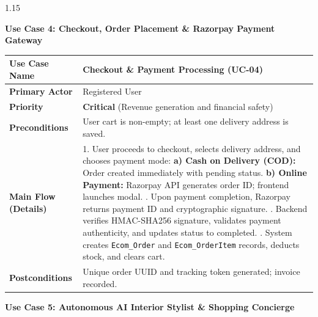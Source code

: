 \documentclass[12pt,a4paper]{article}
\begin{document}
{\fontsize{13}{18}\selectfont
\begin{spacing}{1.15}

\noindent
\textbf{Use Case 4: Checkout, Order Placement \& Razorpay Payment Gateway}

\vspace{0.04in}

\begin{center}
\renewcommand{\arraystretch}{1.2}
\fontsize{10.5}{14}\selectfont
\begin{tabular}{|p{1.6in}|p{4.9in}|}
\hline
\textbf{Use Case Name} & Checkout \& Payment Processing (\textbf{UC-04}) \\ \hline
\textbf{Primary Actor} & Registered User \\ \hline
\textbf{Priority} & \textbf{Critical} (Revenue generation and financial safety) \\ \hline
\textbf{Preconditions} & User cart is non-empty; at least one delivery address is saved. \\ \hline
\textbf{Main Flow (Details)} &
1. User proceeds to checkout, selects delivery address, and chooses payment mode: \newline
   \textbf{a) Cash on Delivery (COD):} Order created immediately with pending status. \newline
   \textbf{b) Online Payment:} Razorpay API generates order ID; frontend launches modal. \newline
2. Upon payment completion, Razorpay returns payment ID and cryptographic signature. \newline
3. Backend verifies HMAC-SHA256 signature, validates payment authenticity, and updates status to completed. \newline
4. System creates \texttt{Ecom\_Order} and \texttt{Ecom\_OrderItem} records, deducts stock, and clears cart. \\ \hline
\textbf{Postconditions} & Unique order UUID and tracking token generated; invoice recorded. \\ \hline
\end{tabular}
\end{center}

\vspace{0.08in}

\noindent
\textbf{Use Case 5: Autonomous AI Interior Stylist \& Shopping Concierge}

\vspace{0.04in}


\end{spacing}}
\end{document}
